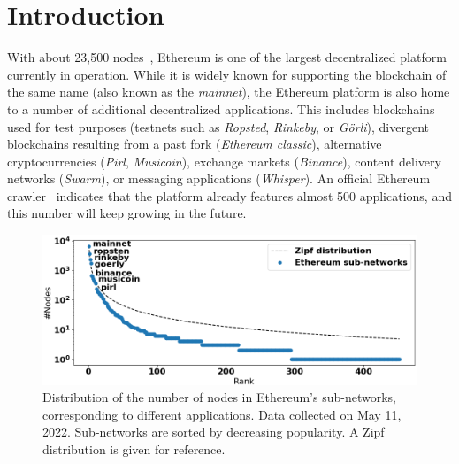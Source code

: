 
\section{Introduction}


With about 23,500 nodes~\cite{discv4-dns-lists},  Ethereum is one of the largest decentralized platform currently in operation.
While it is widely known for supporting the blockchain of the same name (also known as the \emph{mainnet}), the Ethereum platform is also home to a number of additional decentralized applications.
This includes blockchains used for test purposes (testnets such as \emph{Ropsted}, \emph{Rinkeby}, or \emph{G\"orli}), divergent blockchains resulting from a past fork (\emph{Ethereum classic}), alternative cryptocurrencies (\emph{Pirl}, \emph{Musicoin}), exchange markets (\emph{Binance}), content delivery networks (\emph{Swarm}), or messaging applications (\emph{Whisper}).
An official Ethereum crawler~\cite{discv4-dns-lists} indicates that the platform already features almost 500 applications, and this number will keep growing in the future.

\begin{figure}[t]
    \includegraphics[width=1\linewidth]{img/ecosystem}
    \caption{Distribution of the number of nodes in Ethereum's sub-networks, corresponding to different applications.
    Data collected on May 11, 2022.
    Sub-networks are sorted by decreasing popularity.
    A Zipf distribution is given for reference.
    \protect{}
    }
    \label{fig:ecosystem}
\end{figure}


